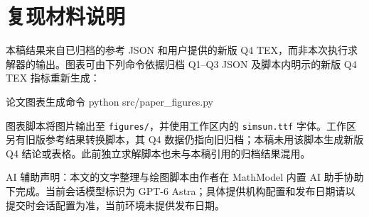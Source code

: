 \section{复现材料说明}
本稿结果来自已归档的参考 JSON 和用户提供的新版 Q4 TEX，而非本次执行求解器的输出。图表可由下列命令依据归档 Q1--Q3 JSON 及脚本内明示的新版 Q4 TEX 指标重新生成：
\begin{Python}{论文图表生成命令}
python src/paper_figures.py
\end{Python}
图表脚本将图片输出至 \texttt{figures/}，并使用工作区内的 \texttt{simsun.ttf} 字体。工作区另有旧版参考结果转换脚本，其 Q4 数据仍指向旧归档；本稿未用该脚本生成新版 Q4 结论或表格。此前独立求解脚本也未与本稿引用的归档结果混用。

AI 辅助声明：本文的文字整理与绘图脚本由作者在 MathModel 内置 AI 助手协助下完成。当前会话模型标识为 GPT-6 Astra；具体提供机构配置和发布日期请以提交时会话配置为准，当前环境未提供发布日期。
